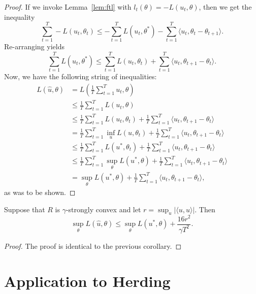 \documentclass{article}
\begin{document}
\begin{proof}
If we invoke Lemma~\ref{lem:ftl} with $l_t(\theta) = -L(u_t, \theta)$, then we get the inequality
\[ \sum_{t=1}^T -L(u_t, \theta_t) \leq -\sum_{t=1}^T L(u_t, \theta^*) - \sum_{t=1}^T \langle u_t, \theta_t - \theta_{t+1} \rangle. \]
Re-arranging yields
\[ \sum_{t=1}^T L(u_t, \theta^*) \leq \sum_{t=1}^T L(u_t, \theta_t) + \sum_{t=1}^T \langle u_t, \theta_{t+1} - \theta_t \rangle. \]
Now, we have the following string of inequalities:
\begin{align*}
L(\hat{u}, \theta) &= L\left(\frac{1}{T} \sum_{t=1}^T u_t, \theta\right) \\
 &\leq \frac{1}{T} \sum_{t=1}^T L(u_t, \theta) \\
 &\leq \frac{1}{T} \sum_{t=1}^T L(u_t, \theta_t) + \frac{1}{T} \sum_{t=1}^T \langle u_t, \theta_{t+1} - \theta_t \rangle \\
 &= \frac{1}{T} \sum_{t=1}^T \inf_{u} L(u, \theta_t) + \frac{1}{T} \sum_{t=1}^T \langle u_t, \theta_{t+1} - \theta_t \rangle \\
 &\leq \frac{1}{T} \sum_{t=1}^T L(u^*, \theta_t) + \frac{1}{T} \sum_{t=1}^T \langle u_t, \theta_{t+1} - \theta_t \rangle \\
 &\leq \frac{1}{T} \sum_{t=1}^T \sup_{\theta} L(u^*, \theta) + \frac{1}{T} \sum_{t=1}^T \langle u_t, \theta_{t+1} - \theta_t \rangle \\
 &= \sup_{\theta} L(u^*, \theta) + \frac{1}{T} \sum_{t=1}^T \langle u_t, \theta_{t+1} - \theta_t \rangle,
\end{align*}
as was to be shown.
\end{proof}
\begin{corollary}
\label{cor:method-2}
Suppose that $R$ is $\gamma$-strongly convex and let $r = \sup_{u} |\langle u, u \rangle|$. Then
\[ \sup_{\theta} L(\hat{u}, \theta) \leq \sup_{\theta} L(u^*, \theta) + \frac{16r^2}{\gamma T^2}. \]
\end{corollary}
\begin{proof}
The proof is identical to the previous corollary.
\end{proof}

\section{Application to Herding}
\label{sec:herding}
\end{document}
